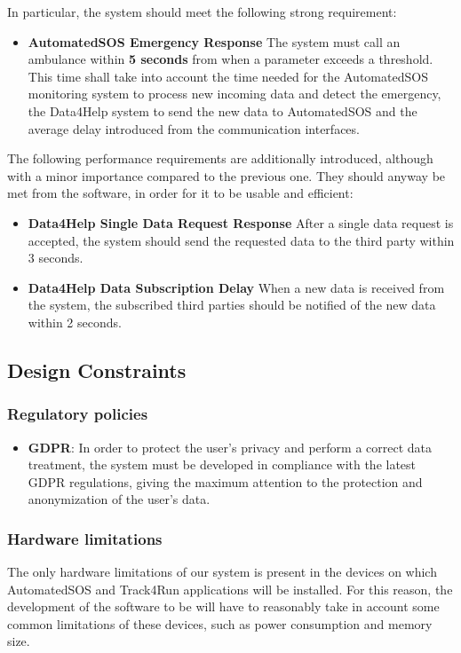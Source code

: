 In particular, the system should meet the following strong requirement:

\begin{itemize}
	\item \textbf{AutomatedSOS Emergency Response}
	The system must call an ambulance within \textbf{5 seconds} from when a parameter exceeds a threshold. This time shall take into account the time needed for the AutomatedSOS monitoring system to process new incoming data and detect the emergency, the Data4Help system to send the new data to AutomatedSOS and the average delay introduced from the communication interfaces.
\end{itemize}

The following performance requirements are additionally introduced, although with a minor importance compared to the previous one. They should anyway be met from the software, in order for it to be usable and efficient:

\begin{itemize}
	\item \textbf{Data4Help Single Data Request Response}
	After a single data request is accepted, the system should send the requested data to the third party within 3 seconds. 
	
	\item \textbf{Data4Help Data Subscription Delay }
	When a new data is received from the system, the subscribed third parties should be notified of the new data within 2 seconds.
\end{itemize}

\subsection{Design Constraints}
\subsubsection{Regulatory policies}
\begin{itemize}
	\item \textbf{GDPR}: In order to protect the user's privacy and perform a correct data treatment, the system must be developed in compliance with the latest GDPR regulations, giving the maximum attention to the protection and anonymization of the user's data.
\end{itemize}
\subsubsection{Hardware limitations}
The only hardware limitations of our system is present in the devices on which AutomatedSOS and Track4Run applications will be installed. For this reason, the development of the software to be will have to reasonably take in account some common limitations of these devices, such as power consumption and memory size.


